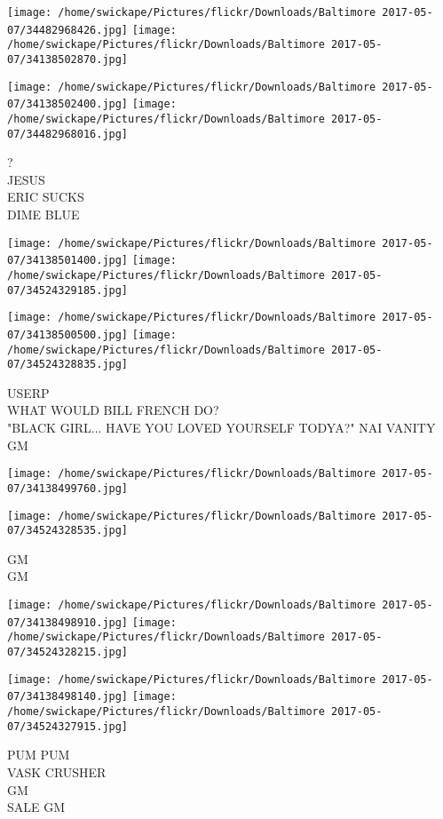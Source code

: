 \documentclass[10pt,letterpaper]{article}
\begin{document}
\texttt{[image: /home/swickape/Pictures/flickr/Downloads/Baltimore 2017-05-07/34482968426.jpg]}
\texttt{[image: /home/swickape/Pictures/flickr/Downloads/Baltimore 2017-05-07/34138502870.jpg]}

\texttt{[image: /home/swickape/Pictures/flickr/Downloads/Baltimore 2017-05-07/34138502400.jpg]}
\texttt{[image: /home/swickape/Pictures/flickr/Downloads/Baltimore 2017-05-07/34482968016.jpg]}

?\\
JESUS\\
ERIC SUCKS\\
DIME BLUE
\pagebreak

\texttt{[image: /home/swickape/Pictures/flickr/Downloads/Baltimore 2017-05-07/34138501400.jpg]}
\texttt{[image: /home/swickape/Pictures/flickr/Downloads/Baltimore 2017-05-07/34524329185.jpg]}

\texttt{[image: /home/swickape/Pictures/flickr/Downloads/Baltimore 2017-05-07/34138500500.jpg]}
\texttt{[image: /home/swickape/Pictures/flickr/Downloads/Baltimore 2017-05-07/34524328835.jpg]}

USERP\\
WHAT WOULD BILL FRENCH DO?\\
"BLACK GIRL... HAVE YOU LOVED YOURSELF TODYA?"  NAI VANITY\\
GM
\pagebreak

\texttt{[image: /home/swickape/Pictures/flickr/Downloads/Baltimore 2017-05-07/34138499760.jpg]}

\vspace{0.25in}
\texttt{[image: /home/swickape/Pictures/flickr/Downloads/Baltimore 2017-05-07/34524328535.jpg]}

GM\\
GM
\pagebreak

\texttt{[image: /home/swickape/Pictures/flickr/Downloads/Baltimore 2017-05-07/34138498910.jpg]}
\texttt{[image: /home/swickape/Pictures/flickr/Downloads/Baltimore 2017-05-07/34524328215.jpg]}

\texttt{[image: /home/swickape/Pictures/flickr/Downloads/Baltimore 2017-05-07/34138498140.jpg]}
\texttt{[image: /home/swickape/Pictures/flickr/Downloads/Baltimore 2017-05-07/34524327915.jpg]}

PUM PUM\\
VASK CRUSHER\\
GM\\
SALE GM
\pagebreak
\end{document}
